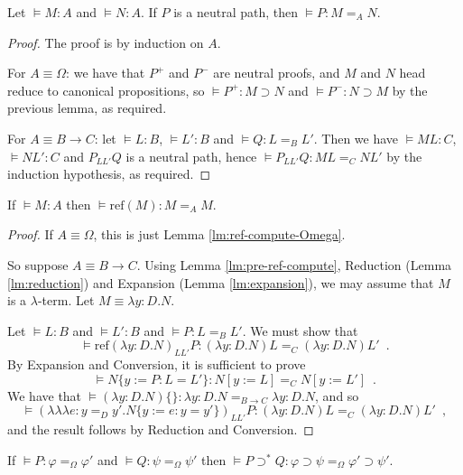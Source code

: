 \documentclass[a4paper,UKenglish]{lipics-v2016}
\newcommand*{\reff}[1]{\ensuremath{\mathrm{ref} \left( {#1} \right)}}
\newcommand*{\triplelambda}{\ensuremath{\lambda \!\! \lambda \!\! \lambda}}
\theoremstyle{plain}
\theoremstyle{definition}
\begin{document}
\begin{lemma}
\label{lm:neutral-path}
Let $\models M : A$ and $\models N : A$.  If $P$ is a neutral path, then $\models P : M =_A N$.
\end{lemma}

\begin{proof}
The proof is by induction on $A$.

For $A \equiv \Omega$: we have that $P^+$ and $P^-$ are neutral proofs, and $M$ and $N$ head reduce to canonical propositions, so $\models P^+ : M \supset N$ and
$\models P^- : N \supset M$ by the previous lemma, as required.

For $A \equiv B \rightarrow C$: let $\models L : B$, $\models L' : B$ and $\models Q : L =_B L'$.  Then we have $\models ML : C$, $\models NL' : C$ and
$P_{LL'} Q$ is a neutral path, hence $\models P_{L L'} Q : ML =_C NL'$ by the induction hypothesis, as required.
\end{proof}

\begin{lemma}
\label{lm:ref-compute}
If $\models M : A$ then $\models \reff{M} : M =_A M$.
\end{lemma}

\begin{proof}
If $A \equiv \Omega$, this is just Lemma \ref{lm:ref-compute-Omega}.

So suppose $A \equiv B \rightarrow C$.  Using Lemma \ref{lm:pre-ref-compute}, Reduction (Lemma \ref{lm:reduction}) and Expansion (Lemma \ref{lm:expansion}),
we may assume that $M$ is a $\lambda$-term.  Let $M \equiv \lambda y:D.N$.

Let $\models L : B$ and $\models L' : B$ and $\models P : L =_B L'$.  We must show that
$$ \models \reff{\lambda y:D.N}_{L L'} P : (\lambda y:D.N)L =_C (\lambda y:D.N)L' \enspace . $$
By Expansion and Conversion, it is sufficient to prove
$$ \models N \{ y := P : L = L' \} : N [ y:= L ] =_C N [y := L'] \enspace . $$
We have that $\models (\lambda y:D.N)\{\} : \lambda y:D.N =_{B \rightarrow C} \lambda y:D.N$, and so
$$ \models (\triplelambda e : y =_D y' . N \{ y := e : y = y' \})_{L L'} P : (\lambda y:D.N)L =_C (\lambda y:D.N)L' \enspace , $$
and the result follows by Reduction and Conversion.
\end{proof}

\begin{lemma}
\label{lm:compute-supset*}
If $\models P : \varphi =_\Omega \varphi'$ and $\models Q : \psi =_\Omega \psi'$ then $\models P \supset^* Q : \varphi \supset \psi =_\Omega \varphi' \supset \psi'$.
\end{lemma}
\end{document}
